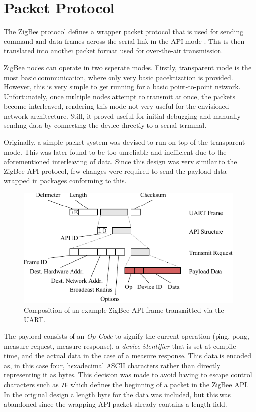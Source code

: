 \section{Packet Protocol}
The ZigBee protocol defines a wrapper packet protocol that is used for sending command and data frames across the serial link in the API mode \cite[page 35]{zigbee-datasheet}. This is then translated into another packet format used for over-the-air transmission.

ZigBee nodes can operate in two seperate modes. Firstly, transparent mode is the most basic communication, where only very basic pacektization is provided. However, this is very simple to get running for a basic point-to-point network. Unfortunately, once multiple nodes attempt to transmit at once, the packets become interleaved, rendering this mode not very useful for the envisioned network architecture. Still, it proved useful for initial debugging and manually sending data by connecting the device directly to a serial terminal.

Originally, a simple packet system was devised to run on top of the transparent mode. This was later found to be too unreliable and inefficient due to the aforementioned interleaving of data. Since this design was very similar to the ZigBee API protocol, few changes were required to send the payload data wrapped in packages conforming to this.

\begin{figure}
\includegraphics[width=\textwidth]{images/packets.pdf}
\caption{Composition of an example ZigBee API frame transmitted via the UART.}
\label{packets-example}
\end{figure}

The payload consists of an \emph{Op-Code} to signify the current operation (ping, pong, measure request, measure response), a \emph{device identifier} that is set at compile-time, and the actual data in the case of a measure response. This data is encoded as, in this case four, hexadecimal ASCII characters rather than directly representing it as bytes. This decision was made to avoid having to escape control characters such as \texttt{7E} which defines the beginning of a packet in the ZigBee API. In the original design a length byte for the data was included, but this was abandoned since the wrapping API packet already contains a length field.



